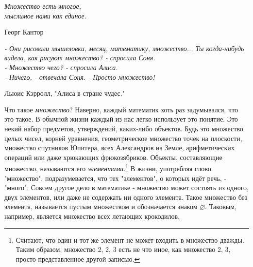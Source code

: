 \epigraph{\textit{Множество есть многое,} \\ \textit{мыслимое нами как единое.}}{Георг Кантор}\epigraph{\textit{- Они рисовали мышеловки, месяц, математику, множество... 
Ты когда-нибудь видела, как рисуют множество? - спросила Соня.}
\\
\textit{- Множество чего? - спросила Алиса.}
\\
\textit{- Ничего, - отвечала Соня. - Просто множество!}}{Льюис Кэрролл, "Алиса в стране чудес."}

Что такое \textit{множество}? Наверно, каждый математик хоть раз задумывался, что это такое. В обычной жизни каждый из нас легко использует это понятие. Это некий набор предметов, утверждений, каких-либо
объектов. Будь это множество целых чисел, корней уравнения, геометрическое множество точек на плоскости, множество спутников Юпитера, всех Александров на Земле, арифметических операций или даже хрюкающих фрюкозябриков. Объекты, составляющие множество, называются его \textit{элементами}.\footnote{Считают, что один и тот же элемент не может входить в множество дважды. Таким образом, множество {2, 2, 3} есть
не что иное, как множество {2, 3}, просто представленное другой записью.} В жизни, употребляя слово "множество", подразумевается, что тех "элементов", о которых идёт речь, - "много". Совсем другое дело в математике - множество может состоять из одного, двух элементов, или даже не содержать ни одного элемента. Такое множество без элемента, называется пустым множеством и обозначается знаком $\varnothing$. Таковым, например, является множество всех летающих крокодилов.

